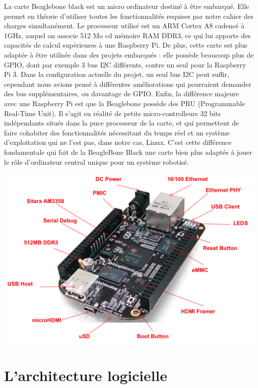 \documentclass{report}
\begin{document}
    {La carte Beaglebone black est un micro ordinateur destiné à être embarqué.
    Elle permet en théorie d'utiliser toutes les fonctionnalités requises par notre
    cahier des charges simultanément. Le processeur utilisé est un ARM Cortex A8
    cadencé à 1GHz, auquel on associe 512 Mo cd mémoire RAM DDR3, ce qui lui apporte
    des capacités de calcul supérieures à une Raspberry Pi. De plus, cette carte
    est plus adaptée à être utilisée dans des projets embarqués : elle possède
    beaucoup plus de GPIO, dont par exemple 3 bus I2C différents, contre un seul
    pour la Raspberry Pi 3. Dans la configuration actuelle du projet, un seul bus I2C
    peut suffir, cependant nous avions pensé à différentes améliorations qui pourraient
    demander des bus supplémentaires, ou davantage de GPIO.
    Enfin, la différence majeure avec une Raspberry Pi est que la Beaglebone
    possède des PRU (Programmable Real-Time Unit). Il s'agit en réalité de petits
    micro-controlleurs 32 bits indépendants situés dans la puce processeur de la carte,
    et qui permettent de faire cohabiter des fonctionnalités nécessitant du temps réel et un
    système d'exploitation qui ne l'est pas, dans notre cas, Linux. C'est cette différence
    fondamentale qui fait de la BeagleBone Black une carte bien plus adaptée à jouer
    le rôle d'ordinateur central unique pour un système robotisé.}

\begin{center}
  \includegraphics[scale=0.8]{img/black_hardware_details.png}
\end{center}

    \section{L'architecture logicielle}
\end{document}
